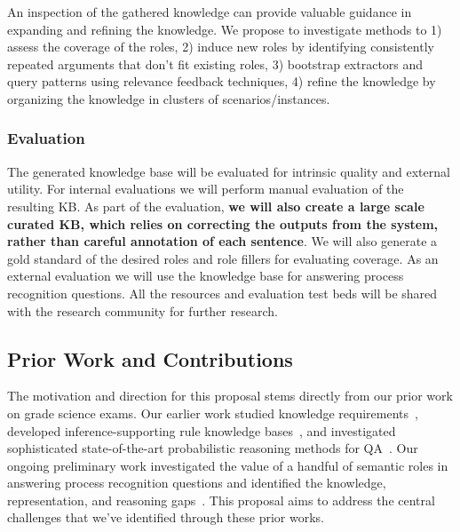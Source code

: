 \begin{itemize}
An inspection of the gathered knowledge can provide valuable guidance in expanding and refining the knowledge.
We propose to investigate methods to 1) assess the coverage of the roles, 2) induce new roles by identifying consistently repeated arguments that don't fit existing roles,  
3) bootstrap extractors and query patterns using relevance feedback techniques, 4) refine the knowledge by organizing the knowledge in clusters of scenarios/instances.

\end{itemize}

\subsubsection*{Evaluation}

The generated knowledge base will be evaluated for intrinsic quality and external utility. For internal evaluations we will perform manual evaluation of the resulting KB. As part of the evaluation, {\bf we will also create a large scale curated KB, which relies on correcting the outputs from the system, rather than careful annotation of each sentence}. We will also generate a gold standard of the desired roles and role fillers for evaluating coverage. As an external evaluation we will use the knowledge base for answering process recognition questions. All the resources and evaluation test beds will be shared with the research community for further research.

\subsection{Prior Work and Contributions}

The motivation and direction for this proposal stems directly from our prior work on grade science exams.  Our earlier work studied knowledge requirements~\cite{chb2013:akbc}, developed inference-supporting rule knowledge bases~\cite{clark2014:akbc}, and investigated sophisticated state-of-the-art probabilistic reasoning methods for QA~\cite{khot2015:emlnlp}. Our ongoing preliminary work investigated the value of a handful of semantic roles in answering process recognition questions and identified the knowledge, representation, and reasoning gaps~\cite{louvan2015:kcap}. This proposal aims to address the central challenges that we've identified through these prior works.

